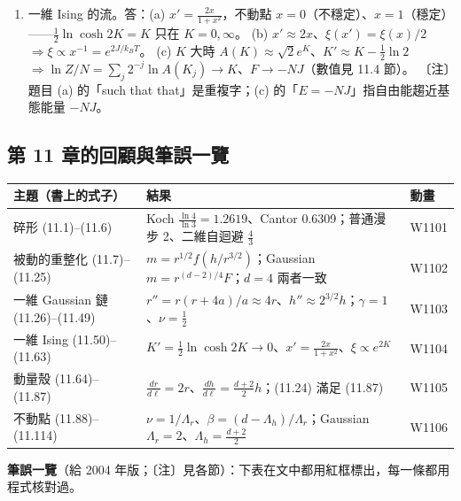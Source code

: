 {\begin{enumerate}[label=\textbf{11.\arabic*},itemsep=0.05em]
$e^{4K_2'}=\frac{\cosh(2K+H)}{\cosh(2K-H)}$、$e^{4K_1'}=\frac{\cosh(2K+H)\cosh(2K-H)}{\cosh^2H}$、$A^4=16\cosh(2K+H)\cosh(2K-H)\cosh^2H$；
新外場 $H'=H+2K_2'$（自己的 $H$ 加兩邊各 $K_2'$）。$K=1$、$H=0.1$：3.8897、0.6602、0.0482、0.1964；暴力核對 $Z_8(K,H)=A^4Z_4(K_1',H')$。
〔注〕題目的 $K_1,K_2$ 指 $J/k_BT$、$h/k_BT$，和 (11.62) 的 $K_n$ 撞名。
\item 一維 Ising 的流。\quad 答：(a) $x'=\frac{2x}{1+x^2}$，不動點 $x=0$（不穩定）、$x=1$（穩定）——$\frac12\ln\cosh2K=K$ 只在 $K=0,\infty$。
(b) $x'\approx2x$、$\xi(x')=\xi(x)/2$ $\Rightarrow\xi\propto x^{-1}=e^{2J/k_BT}$。
(c) $K$ 大時 $A(K)\approx\sqrt2e^K$、$K'\approx K-\frac12\ln2$ $\Rightarrow\ln Z/N=\sum_j2^{-j}\ln A(K_j)\to K$、$F\to-NJ$（數值見 11.4 節）。
〔注〕題目 (a) 的「such that that」是重複字；(c) 的「$E=-NJ$」指自由能趨近基態能量 $-NJ$。
\end{enumerate}}

\subsection{第 11 章的回顧與筆誤一覽}
\begin{center}
\footnotesize\setlength{\tabcolsep}{4pt}
\begin{tabular}{@{}lll@{}}
\toprule
主題（書上的式子） & 結果 & 動畫\\
\midrule
碎形 (11.1)--(11.6) & Koch $\frac{\ln4}{\ln3}=1.2619$、Cantor 0.6309；普通漫步 2、二維自迴避 $\frac43$ & W1101\\
被動的重整化 (11.7)--(11.25) & $m=r^{1/2}f(h/r^{3/2})$；Gaussian $m=r^{(d-2)/4}F$；$d=4$ 兩者一致 & W1102\\
一維 Gaussian 鏈 (11.26)--(11.49) & $r''=r(r+4a)/a\approx4r$、$h''\approx2^{3/2}h$；$\gamma=1$、$\nu=\frac12$ & W1103\\
一維 Ising (11.50)--(11.63) & $K'=\frac12\ln\cosh2K\to0$、$x'=\frac{2x}{1+x^2}$、$\xi\propto e^{2K}$ & W1104\\
動量殼 (11.64)--(11.87) & $\frac{dr}{d\ell}=2r$、$\frac{dh}{d\ell}=\frac{d+2}2h$；(11.24) 滿足 (11.87) & W1105\\
不動點 (11.88)--(11.114) & $\nu=1/\Lambda_r$、$\beta=(d-\Lambda_h)/\Lambda_r$；Gaussian $\Lambda_r=2$、$\Lambda_h=\frac{d+2}2$ & W1106\\
\bottomrule
\end{tabular}
\end{center}
\textbf{筆誤一覽}（給 2004 年版；〔注〕見各節）：下表在文中都用紅框標出，每一條都用程式核對過。
\begin{center}
\footnotesize\renewcommand{\arraystretch}{0.9}
\ElevenTabErrata
\end{center}
